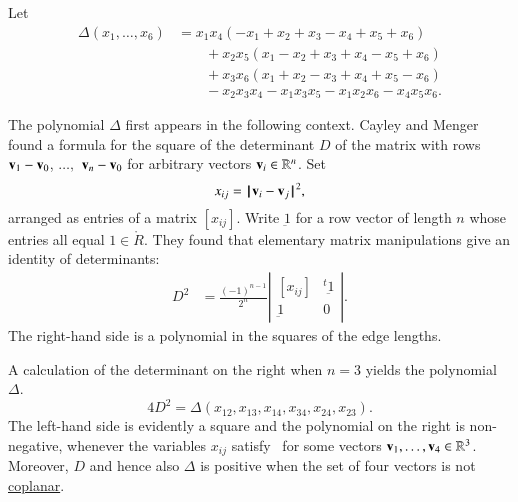 \begin{definition}[$\Delta$]\label{def:delta}
  Let
\begin{align*}
\Delta(x_1,\ldots,x_6) &= x_1 x_4 (- x_1+x_2+x_3- x_4+x_5+x_6)\\
&\qquad+x_2 x_5 (x_1- x_2+x_3+x_4- x_5+x_6)\\
&\qquad+x_3 x_6 (x_1+x_2- x_3+x_4+x_5- x_6)\\
&\qquad- x_2 x_3 x_4- x_1 x_3 x_5- x_1 x_2 x_6- x_4 x_5 x_6.
\end{align*}
\end{definition}
%
%

\begin{remark}\label{rem:cayley}
  The polynomial $\Delta$ first appears in the following context.
  Cayley and Menger found a formula for the square of the determinant
  $D$ of the matrix with rows ${\mathbf v}_1-{\mathbf v}_0$, $\ldots,$ ${\mathbf v}_n-{\mathbf v}_0$ for
  arbitrary vectors ${\mathbf v}_i\in\mathbb{R}^n$.  Set
\begin{equation}\label{eqn:xij}
x_{ij} = \norm{\v_i}{\v_j}^2,
\end{equation}
arranged as entries of a matrix $[x_{ij}]$.
Write $\underbar 1$ for a row vector of length $n$ 
whose entries all equal $1\in\ring{R}$.
They found that elementary matrix manipulations give an identity
of determinants:
\begin{align}\label{eqn:cmd}
D^2 &= \frac{(-1)^{n-1}}{2^n}
\left|\begin{matrix}[x_{ij}]& {}^t{\underbar 1}\\ {\underbar 1}& 0
\end{matrix}\right|.
\end{align}
The right-hand side is a polynomial in the squares of the edge lengths.

A calculation of the determinant on the right when $n=3$ yields 
the polynomial $\Delta$.
\begin{displaymath}
4 D^2 = \Delta(x_{12},x_{13},x_{14},x_{34},x_{24},x_{23}).
\end{displaymath}
The left-hand side is evidently a square and the polynomial on the
right is non-negative, whenever the variables $x_{ij}$
satisfy~ for some vectors
${\mathbf v}_1,\ldots,{\mathbf v}_4\in\mathbb{R}^3$.  Moreover, $D$ and hence also
$\Delta$ is positive when the set of four vectors is not
\hyperref[def:plane]{coplanar}.
\end{remark}
%
%
%
%
%

